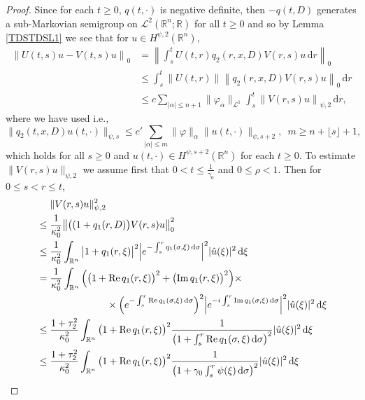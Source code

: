 \documentclass[a4paper, 12pt]{report}
\theoremstyle{cor}
\theoremstyle{remark}
\theoremstyle{definition}
\begin{document}
\begin{proof}
Since for each $t \ge 0$, $q(t, \cdot)$ is negative definite, then $-q(t, D)$ generates a sub-Markovian semigroup on $\mathcal{L}^2(\mathbb{R}^n; \mathbb{R})$ for all $t \ge 0$ and so by Lemma \ref{TDSTDSL1} we see that for $u \in H^{\psi, 2}(\mathbb{R}^n)$,
$$
\begin{aligned}
\left\|U(t, s)u - V(t, s)u\right\|_0 & = \left\|\int_s^tU(t, r)q_2(r, x, D)V(r, s)u\,\mathrm{d}r\right\|_0\\
& \le \int_s^t\left\|U(t, r)\right\|\left\|q_2(r, x, D)V(r, s)u\right\|_0\,\mathrm{d}r\\
& \le c\sum_{|\alpha| \le n + 1}\|\varphi_{\alpha}\|_{\mathcal{L}^1}\int_s^t\left\|V(r, s)u\right\|_{\psi, 2}\,\mathrm{d}r,
\end{aligned}
$$
where we have used \cite[Theorem 6.11]{RZ} i.e.,
$$
\|q_2(t, x, D)u(t, \cdot)\|_{\psi, s} \le c'\sum_{|\alpha| \le m}\|\varphi\|_\alpha\|u(t, \cdot)\|_{\psi, s + 2}, \,\,\, m \ge n + \lfloor s\rfloor + 1,
$$
which holds for all $s \ge 0$ and $u(t, \cdot) \in H^{\psi, s + 2}(\mathbb{R}^n)$ for each $t \ge 0$.  To estimate $\|V(r, s)u\|_{\psi, 2}$ we assume first that $0 < t \le \frac{1}{\gamma_0}$ and $0 \le \rho < 1$.  Then for $0 \le s < r \le t$,
$$
\begin{aligned}
& \,\,\,\,\,\,\,\, \|V(r, s)u\|_{\psi, 2}^2\\
& \le \frac{1}{\kappa_0^2}\big\|\big((1 + q_1(r, D)\big)V(r, s)u\big\|_0^2\\
& \le \frac{1}{\kappa_0^2}\int_{\mathbb{R}^n}\big|1 + q_1(r, \xi)\big|^2\Big|e^{-\int_s^rq_1(\sigma, \xi)\,\mathrm{d}\sigma}\Big|^2|\hat{u}(\xi)|^2\,\mathrm{d}\xi\\
& = \frac{1}{\kappa_0^2}\int_{\mathbb{R}^n}\Big(\big(1 + \text{Re}\,q_1(r, \xi)\big)^2 + \big(\text{Im}\,q_1(r, \xi)\big)^2\Big)\times\\
& \hspace{2.5cm} \times\Big(e^{-\int_s^r\text{Re}\,q_1(\sigma, \xi)\,\mathrm{d}\sigma}\Big)^2\Big|e^{-i\int_s^r\text{Im}\,q_1(\sigma, \xi)\,\mathrm{d}\sigma}\Big|^2|\hat{u}(\xi)|^2\,\mathrm{d}\xi\\
& \le \frac{1 + \tau_2^2}{\kappa_0^2}\int_{\mathbb{R}^n}\big(1 + \text{Re}\,q_1(r, \xi)\big)^2\frac{1}{\left(1 + \int_s^r\text{Re}\,q_1(\sigma, \xi)\,\mathrm{d}\sigma\right)^2}|\hat{u}(\xi)|^2\,\mathrm{d}\xi\\
& \le \frac{1 + \tau_2^2}{\kappa_0^2}\int_{\mathbb{R}^n}\big(1 + \text{Re}\,q_1(r, \xi)\big)^2\frac{1}{\left(1 + \gamma_0\int_s^r\psi(\xi)\,\mathrm{d}\sigma\right)^2}|\hat{u}(\xi)|^2\,\mathrm{d}\xi\\

\end{aligned}$$
\end{proof}
\end{document}
